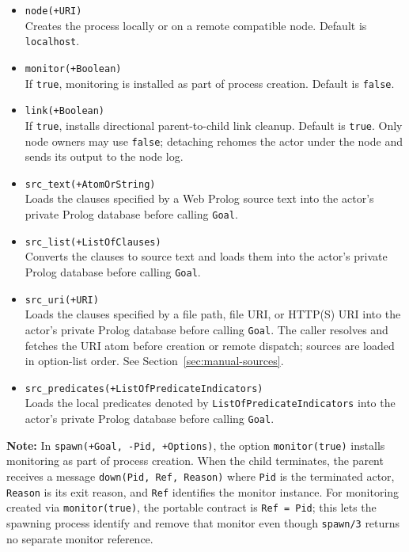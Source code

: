 \begin{itemize}
\item
  \texttt{node(\allowbreak{}+URI)}\\
  Creates the process locally or on a remote compatible node. Default is
  \texttt{localhost}.
\item
  \texttt{monitor(\allowbreak{}+Boolean)}\\
  If \texttt{true}, monitoring is installed as part of process creation.
  Default is \texttt{false}.
\item
  \texttt{link(\allowbreak{}+Boolean)}\\
  If \texttt{true}, installs directional parent-to-child link cleanup.
  Default is \texttt{true}. Only node owners may use \texttt{false};
  detaching rehomes the actor under the node and sends its output to the node log.
\item
  \texttt{src\_\allowbreak{}text(\allowbreak{}+AtomOrString)}\\
  Loads the clauses specified by a Web Prolog source text into the actor's
  private Prolog database before calling \texttt{Goal}.
\item
  \texttt{src\_\allowbreak{}list(\allowbreak{}+ListOfClauses)}\\
  Converts the clauses to source text and loads them into the actor's private
  Prolog database before calling \texttt{Goal}.
\item
  \texttt{src\_\allowbreak{}uri(\allowbreak{}+URI)}\\
  Loads the clauses specified by a file path, file URI, or HTTP(S) URI into
  the actor's private Prolog database before calling \texttt{Goal}.
  The caller resolves and fetches the URI atom before creation or remote
  dispatch; sources are loaded in option-list order. See
  Section~\ref{sec:manual-sources}.
\item
  \texttt{src\_\allowbreak{}predicates(\allowbreak{}+ListOfPredicateIndicators)}\\
  Loads the local predicates denoted by
  \texttt{ListOfPredicateIndicators} into the actor's private Prolog database
  before calling \texttt{Goal}.
\end{itemize}

\noindent \textbf{Note:} In \texttt{spawn(\allowbreak{}+Goal,\allowbreak{}\,\allowbreak{}-Pid,\allowbreak{}\,\allowbreak{}+Options)}, the option
\texttt{monitor(\allowbreak{}true)} installs monitoring as part of process creation. When
the child terminates, the parent receives a message
\texttt{down(\allowbreak{}Pid,\allowbreak{}\,\allowbreak{}Ref,\allowbreak{}\,\allowbreak{}Reason)} where \texttt{Pid} is the terminated actor,
\texttt{Reason} is its exit reason, and \texttt{Ref} identifies the monitor
instance. For monitoring created via \texttt{monitor(\allowbreak{}true)}, the portable
contract is \texttt{Ref\,\allowbreak{}=\,\allowbreak{}Pid}; this lets the spawning process
identify and remove that monitor even though \texttt{spawn/\allowbreak{}3} returns no
separate monitor reference.\\

